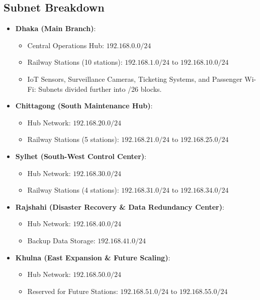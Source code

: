 \documentclass[12pt]{article}
\begin{document}
\subsection*{Subnet Breakdown}
\begin{itemize}
    \item \textbf{Dhaka (Main Branch)}:
    \begin{itemize}
        \item Central Operations Hub: $192.168.0.0/24$
        \item Railway Stations (10 stations): $192.168.1.0/24$ to $192.168.10.0/24$
        \item IoT Sensors, Surveillance Cameras, Ticketing Systems, and Passenger Wi-Fi: Subnets divided further into /26 blocks.
    \end{itemize}
    \item \textbf{Chittagong (South Maintenance Hub)}:
    \begin{itemize}
        \item Hub Network: $192.168.20.0/24$
        \item Railway Stations (5 stations): $192.168.21.0/24$ to $192.168.25.0/24$
    \end{itemize}
    \item \textbf{Sylhet (South-West Control Center)}:
    \begin{itemize}
        \item Hub Network: $192.168.30.0/24$
        \item Railway Stations (4 stations): $192.168.31.0/24$ to $192.168.34.0/24$
    \end{itemize}
    \item \textbf{Rajshahi (Disaster Recovery \& Data Redundancy Center)}:
    \begin{itemize}
        \item Hub Network: $192.168.40.0/24$
        \item Backup Data Storage: $192.168.41.0/24$
    \end{itemize}
    \item \textbf{Khulna (East Expansion \& Future Scaling)}:
    \begin{itemize}
        \item Hub Network: $192.168.50.0/24$
        \item Reserved for Future Stations: $192.168.51.0/24$ to $192.168.55.0/24$
    \end{itemize}
\end{itemize}
\end{document}

